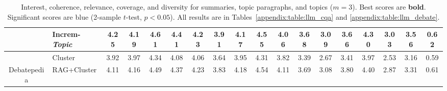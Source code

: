 \begin{table*}[t]
\begin{tabular}{@{}clccccccccccccccc|c@{}}
 & \multicolumn{1}{l|}{Increm-\textit{Topic}} & \cellcolor[HTML]{DAE8FC}\textbf{4.25} & \cellcolor[HTML]{DAE8FC}4.19 & \cellcolor[HTML]{DAE8FC}4.61 & \cellcolor[HTML]{DAE8FC}4.41 & \multicolumn{1}{c|}{\cellcolor[HTML]{DAE8FC}4.23} & \cellcolor[HTML]{DAE8FC}3.91 & \cellcolor[HTML]{DAE8FC}4.17 & \cellcolor[HTML]{DAE8FC}4.55 & \cellcolor[HTML]{DAE8FC}4.06 & \multicolumn{1}{c|}{\cellcolor[HTML]{DAE8FC}3.68} & 3.09 & 3.66 & 4.30 & 3.03 & 3.56 & 0.62 \\ \bottomrule
 & \multicolumn{1}{l|}{Cluster} & 3.92 & 3.97 & 4.34 & 4.08 & \multicolumn{1}{c|}{4.06} & 3.64 & 3.95 & 4.31 & 3.82 & \multicolumn{1}{c|}{3.39} & 2.67 & 3.41 & 3.97 & 2.53 & 3.16 & 0.59 \\
\multirow{-11}{*}{Debatepedia} & \multicolumn{1}{l|}{RAG+Cluster} & \cellcolor[HTML]{DAE8FC}4.11 & \cellcolor[HTML]{DAE8FC}4.16 & 4.49 & \cellcolor[HTML]{DAE8FC}4.37 & \multicolumn{1}{c|}{\cellcolor[HTML]{DAE8FC}4.23} & \cellcolor[HTML]{DAE8FC}3.83 & \cellcolor[HTML]{DAE8FC}4.18 & \cellcolor[HTML]{DAE8FC}4.54 & \cellcolor[HTML]{DAE8FC}4.11 & \multicolumn{1}{c|}{\cellcolor[HTML]{DAE8FC}3.69} & 3.08 & 3.80 & 4.40 & 2.87 & 3.31 & 0.61 \\ \bottomrule
\end{tabular}
\vspace{-3.5ex}
\caption{\label{table:llm_eval} Interest, coherence, relevance, coverage, and diversity for summaries, topic paragraphs, and topics ($m=3$). Best scores are \textbf{bold}. Significant scores are \colorbox{myblue}{blue} (2-sample $t$-test, $p<0.05$). All results are in Tables~\ref{appendix:table:llm_cqa} and \ref{appendix:table:llm_debate}. }
\end{table*}
\vspace{-1ex}